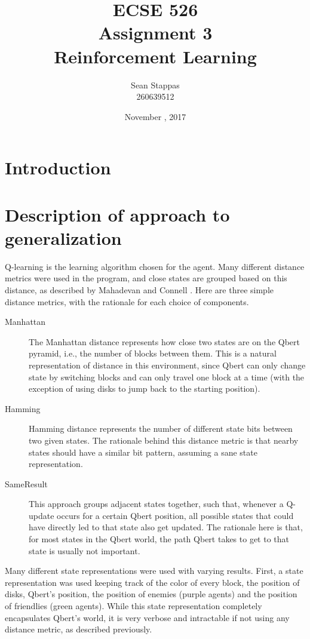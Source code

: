 \documentclass[a4paper,titlepage]{article}
\title{
	\textbf{ECSE 526 \\ Assignment 3}
	\\ \large Reinforcement Learning
}
\author{Sean Stappas \\ 260639512}
\date{November \nth{7}, 2017}
\begin{document}
	\sloppy
	\maketitle
	\twocolumn
	
	\section*{Introduction}
	
	
	\section{Description of approach to generalization}
	
	Q-learning is the learning algorithm chosen for the agent. Many different distance metrics were used in the program, and close states are grouped based on this distance, as described by Mahadevan and Connell \cite{mahadevan}. Here are three simple distance metrics, with the rationale for each choice of components.
	
	\begin{description}
		\item[Manhattan] The Manhattan distance represents how close two states are on the Qbert pyramid, i.e., the number of blocks between them. This is a natural representation of distance in this environment, since Qbert can only change state by switching blocks and can only travel one block at a time (with the exception of using disks to jump back to the starting position).
		\item[Hamming] Hamming distance represents the number of different state bits between two given states. The rationale behind this distance metric is that nearby states should have a similar bit pattern, assuming a sane state representation.
		\item[SameResult] This approach groups adjacent states together, such that, whenever a Q-update occurs for a certain Qbert position, all possible states that could have directly led to that state also get updated. The rationale here is that, for most states in the Qbert world, the path Qbert takes to get to that state is usually not important.
	\end{description}
	
	Many different state representations were used with varying results. First, a state representation was used keeping track of the color of every block, the position of disks, Qbert's position, the position of enemies (purple agents) and the position of friendlies (green agents). While this state representation completely encapsulates Qbert's world, it is very verbose and intractable if not using any distance metric, as described previously.
	
\end{document}
